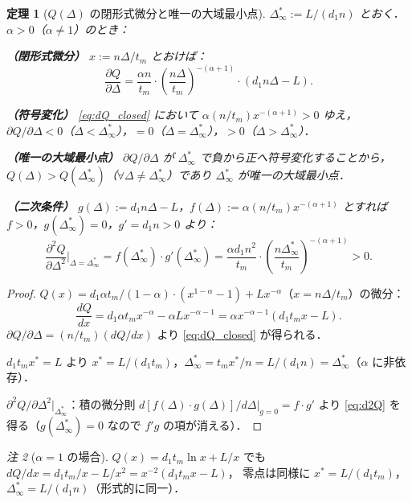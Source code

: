 \documentclass[12pt,a4paper]{article}
\theoremstyle{plain}
\newtheorem{theorem}{定理}[section]
\theoremstyle{definition}
\theoremstyle{remark}
\newtheorem{remark}[theorem]{注}
\newcommand{\Dinf}{\Delta^{*}_{\infty}}
\begin{document}
\begin{theorem}[$Q(\Delta)$ の閉形式微分と唯一の大域最小点]\label{thm:dQ_zero}
$\Dinf:=L/(d_1 n)$ とおく．$\alpha>0$（$\alpha\ne1$）のとき：

\noindent\textbf{（閉形式微分）}
$x:=n\Delta/t_m$ とおけば：
\begin{equation}\label{eq:dQ_closed}
\frac{\partial Q}{\partial\Delta}
=\frac{\alpha n}{t_m}\cdot\left(\frac{n\Delta}{t_m}\right)^{-(\alpha+1)}\cdot(d_1 n\Delta-L).
\end{equation}

\noindent\textbf{（符号変化）}
\eqref{eq:dQ_closed} において $\alpha(n/t_m)x^{-(\alpha+1)}>0$ ゆえ，
$\partial Q/\partial\Delta<0$（$\Delta<\Dinf$），$=0$（$\Delta=\Dinf$），$>0$（$\Delta>\Dinf$）．

\noindent\textbf{（唯一の大域最小点）}
$\partial Q/\partial\Delta$ が $\Dinf$ で負から正へ符号変化することから，
$Q(\Delta)>Q(\Dinf)$（$\forall\Delta\ne\Dinf$）であり $\Dinf$ が唯一の大域最小点．

\noindent\textbf{（二次条件）}
$g(\Delta):=d_1 n\Delta-L$，$f(\Delta):=\alpha(n/t_m)x^{-(\alpha+1)}$ とすれば
$f>0$，$g(\Dinf)=0$，$g'=d_1 n>0$ より：
\begin{equation}\label{eq:d2Q}
\frac{\partial^2 Q}{\partial\Delta^2}\bigg|_{\Delta=\Dinf}
=f(\Dinf)\cdot g'(\Dinf)
=\frac{\alpha d_1 n^2}{t_m}\cdot\left(\frac{n\Dinf}{t_m}\right)^{-(\alpha+1)}>0.
\end{equation}
\end{theorem}

\begin{proof}
$Q(x)=d_1\alpha t_m/(1-\alpha)\cdot(x^{1-\alpha}-1)+Lx^{-\alpha}$（$x=n\Delta/t_m$）の微分：
\[
\frac{dQ}{dx}=d_1\alpha t_m x^{-\alpha}-\alpha L x^{-\alpha-1}
=\alpha x^{-\alpha-1}(d_1 t_m x-L).
\]
$\partial Q/\partial\Delta=(n/t_m)(dQ/dx)$ より \eqref{eq:dQ_closed} が得られる．

$d_1 t_m x^*=L$ より $x^*=L/(d_1 t_m)$，$\Dinf =t_m x^*/n=L/(d_1 n)=\Dinf$（$\alpha$ に非依存）．

$\partial^2 Q/\partial\Delta^2|_{\Dinf}$：積の微分則 $d[f(\Delta)\cdot g(\Delta)]/d\Delta|_{g=0}=f\cdot g'$ より
\eqref{eq:d2Q} を得る（$g(\Dinf)=0$ なので $f'g$ の項が消える）．
\end{proof}

\begin{remark}[$\alpha=1$ の場合]
$Q(x)=d_1 t_m\ln x+L/x$ でも $dQ/dx=d_1 t_m/x-L/x^2=x^{-2}(d_1 t_m x-L)$，
零点は同様に $x^*=L/(d_1 t_m)$，$\Dinf=L/(d_1 n)$（形式的に同一）．
\end{remark}
\end{document}

